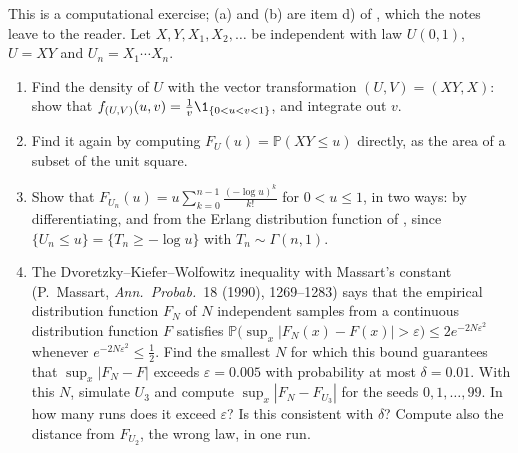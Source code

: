 \begin{exercise}\label{ex:rv-products-uniforms}
\medium This is a computational exercise; (a) and (b) are item d) of
, which the notes leave to the reader. Let $X,Y,X_1,X_2,\dots$ be
independent with law $U(0,1)$, $U=XY$ and $U_n=X_1\cdots X_n$.
\begin{enumerate}[label=(\alph*)]
  \item Find the density of $U$ with the vector transformation $(U,V)=(XY,X)$: show that
    $f_{(U,V)}(u,v)=\frac1v\1_{\{0<u<v<1\}}$, and integrate out $v$.
  \item Find it again by computing $F_U(u)=\mathbb P(XY\le u)$ directly, as the area of a subset of the
    unit square.
  \item Show that $F_{U_n}(u)=u\sum_{k=0}^{n-1}\frac{(-\log u)^k}{k!}$ for $0<u\le1$, in two ways: by
    differentiating, and from the Erlang distribution function of , since
    $\{U_n\le u\}=\{T_n\ge-\log u\}$ with $T_n\sim\Gamma(n,1)$.
  \item The Dvoretzky--Kiefer--Wolfowitz inequality with Massart's constant (P.~Massart, \emph{Ann.\
    Probab.}\ 18 (1990), 1269--1283) says
    that the empirical distribution function $F_N$ of $N$ independent samples from a continuous
    distribution function $F$ satisfies $\mathbb P\big(\sup_x|F_N(x)-F(x)|>\varepsilon\big)\le
    2e^{-2N\varepsilon^2}$ whenever $e^{-2N\varepsilon^2}\le\frac12$. Find the smallest $N$ for which
    this bound guarantees that $\sup_x|F_N-F|$ exceeds $\varepsilon=0.005$ with probability at most
    $\delta=0.01$. With this $N$, simulate $U_3$ and compute $\sup_x|F_N-F_{U_3}|$ for the seeds
    $0,1,\dots,99$. In how many runs does it exceed $\varepsilon$? Is this consistent with $\delta$?
    Compute also the distance from $F_{U_2}$, the wrong law, in one run.
\end{enumerate}
\end{exercise}


